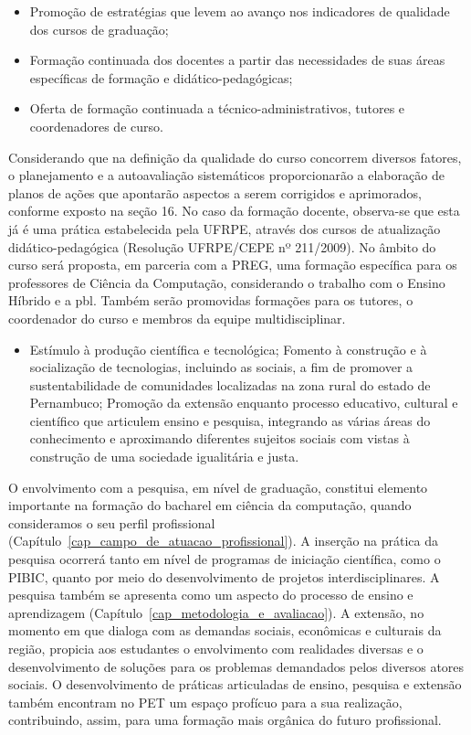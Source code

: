 \documentclass[
	12pt,				%
	openright,			%
  oneside,     %
	a4paper,			%
 hyphens,
	chapter=TITLE,		%
	english,			%
	french,				%
	spanish,			%
	brazil				%
	]{abntex2}
\begin{document}
\begin{itemize}
	\item Promoção de estratégias que levem ao avanço nos indicadores de qualidade dos cursos de graduação;
	\item Formação continuada dos docentes a partir das necessidades de suas áreas específicas de formação e didático-pedagógicas;
	\item Oferta de formação continuada a técnico-administrativos, tutores e coordenadores de curso.
\end{itemize}

Considerando que na definição da qualidade do curso concorrem diversos fatores, o planejamento e a autoavaliação sistemáticos proporcionarão a elaboração de planos de ações que apontarão aspectos a serem corrigidos e aprimorados, conforme exposto na seção 16. No caso da formação docente, observa-se que esta já é uma prática estabelecida pela UFRPE, através dos cursos de atualização didático-pedagógica (Resolução UFRPE/CEPE nº 211/2009). No âmbito do curso será proposta, em parceria com a PREG, uma formação específica para os professores de Ciência da Computação, considerando o trabalho com o Ensino Híbrido e a \acrshort{pbl}. Também serão promovidas formações para os tutores, o coordenador do curso e membros da equipe multidisciplinar.	 
	 	
\begin{itemize}
	\item Estímulo à produção científica e tecnológica; 
	Fomento à construção e à socialização de tecnologias, incluindo as sociais, a fim de promover a sustentabilidade de comunidades localizadas na zona rural do estado de Pernambuco; 	
	Promoção da extensão enquanto processo educativo, cultural e científico que articulem ensino e pesquisa, integrando as várias áreas do conhecimento e aproximando diferentes sujeitos sociais com vistas à construção de uma sociedade igualitária e justa.
\end{itemize}

O envolvimento com a pesquisa, em nível de graduação, constitui elemento importante na formação do bacharel em ciência da computação, quando consideramos o seu perfil profissional (Capítulo~\ref{cap_campo_de_atuacao_profissional}). A inserção na prática da pesquisa ocorrerá tanto em nível de programas de iniciação científica, como o PIBIC, quanto por meio do desenvolvimento de projetos interdisciplinares. A pesquisa também se apresenta como um aspecto do processo de ensino e aprendizagem (Capítulo~\ref{cap_metodologia_e_avaliacao}). A extensão, no momento em que dialoga com as demandas sociais, econômicas e culturais da região, propicia aos estudantes o envolvimento com realidades diversas e o desenvolvimento de soluções para os problemas demandados pelos diversos atores sociais. O desenvolvimento de práticas articuladas de ensino, pesquisa e extensão também encontram no PET um espaço profícuo para a sua realização, contribuindo, assim, para uma formação mais orgânica do futuro profissional.	 	 	
\end{document}
